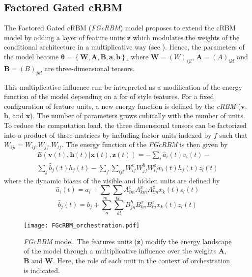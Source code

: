 \documentclass{amsart}
\begin{document}
	\subsection{Factored Gated cRBM}
	The Factored Gated cRBM (\textit{FGcRBM}) model  \cite{taylor2009factored} proposes to extend the cRBM model by adding a layer of feature units $\bm{z}$ which modulates the weights of the conditional architecture in a multiplicative way (see ). Hence, the parameters of the model become $\bm{\theta} = \left\lbrace \bm{W} , \bm{A} , \bm{B} , \bm{a} , \bm{b} \right\rbrace$, where $\bm{W} = (W)_{ijl}$, $\bm{A}=(A)_{ikl}$ and $\bm{B}=(B)_{jkl}$ are three-dimensional tensors.
	
	This multiplicative influence can be interpreted as a modification of the energy function of the model depending on a for of style features. For a fixed configuration of feature units, a new energy function is defined by the \textit{cRBM} ($\bm{v}$, $\bm{h}$, and $\bm{x}$). The number of parameters grows cubically with the number of units. To reduce the computation load, the three dimensional tensors can be factorized into a product of three matrices by including factor units indexed by $f$ such that $W_{ijl} = W_{if} . W_{jf} . W_{lf}$.
	The energy function of the \textit{FGcRBM} is then given by
	\begin{equation}
	\begin{split}
	E(\bm{v}(t),\bm{h}(t)|\bm{x}(t),\bm{z}(t)) = - \sum_{i} \hat{a}_{i}(t)v_{i}(t) - \\ \sum_{j} \hat{b}_{j}(t)h_{j}(t)
	-\sum_{f}\sum_{ijl} W_{if}^{v} W_{jf}^{h} W_{lf}^{z} v_{i}(t) h_{j}(t) z_{l}(t) 
	\end{split}
	\end{equation}
	where the dynamic biases of the visible and hidden units are defined by
	\begin{equation}
	\hat{a}_{i}(t) = a_{i} + \sum_{m} \sum_{kl}A_{im}^{v}A_{km}^{x}A_{lm}^{z}x_{k}(t)z_{l}(t)
	\end{equation}
	\begin{equation}
	\hat{b}_{j}(t) = b_{j} + \sum_{n} \sum_{kl}B_{jn}^{h}B_{kn}^{x}B_{ln}^{z}x_{k}(t)z_{l}(t)
	\end{equation}
	
	\begin{figure}[ht]
		\centering
		\texttt{[image: FGcRBM\_orchestration.pdf]}
		\caption{\textit{FGcRBM} model. The features units ($\bm{z}$) modify the energy landscape of the model through a multiplicative influence over the weights $\bm{A}$, $\bm{B}$ and $\bm{W}$. Here, the role of each unit in the context of orchestration is indicated.}
		\label{fig:FGcRBM}
	\end{figure}
	
\end{document}
